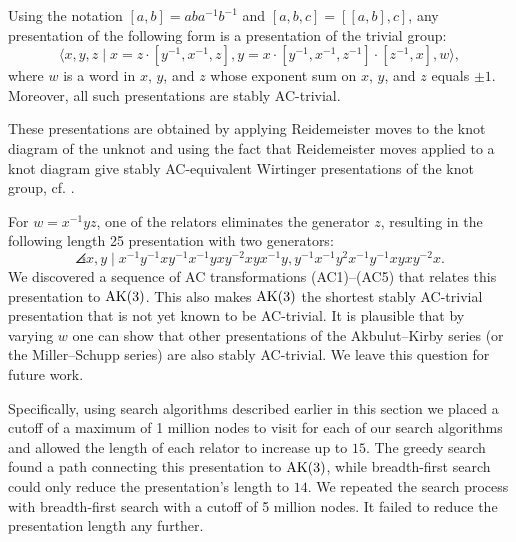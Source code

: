 \begin{theorem*}\label{theorem:MMS}
	Using the notation $[a, b] = a b a^{-1} b^{-1}$ and $[a, b, c] = [[a, b], c]$, any presentation of the following form is a presentation of the trivial group:
	\[
	\langle x, y, z \mid x = z \cdot [y^{-1}, x^{-1}, z], y = x \cdot [y^{-1}, x^{-1}, z^{-1}] \cdot [z^{-1}, x], w \rangle,
	\]
	where $w$ is a word in $x$, $y$, and $z$ whose exponent sum on $x$, $y$, and $z$ equals $\pm 1$. Moreover, all such presentations are stably AC-trivial.
\end{theorem*}

These presentations are obtained by applying Reidemeister moves to the knot diagram of the unknot and using the fact that Reidemeister moves applied to a knot diagram give stably AC-equivalent Wirtinger presentations of the knot group, cf. \cite{WADA1994241}.

For $w = x^{-1}yz$, one of the relators eliminates the generator $z$, resulting in the following length 25 presentation with two generators:
\[
\angles{ x, y \mid
	x^{-1}y^{-1}xy^{-1}x^{-1}yxy^{-2}xyx^{-1}y,
	y^{-1}x^{-1}y^2x^{-1}y^{-1}xyxy^{-2}x }.
\]
We discovered a sequence of AC transformations (AC1)--(AC5) that relates this presentation to $\text{AK}(3)$.
This also makes $\text{AK}(3)$ the shortest stably AC-trivial presentation that is not yet known to be AC-trivial.
It is plausible that by varying $w$ one can show that other presentations of the Akbulut--Kirby series (or the Miller--Schupp series) are also stably AC-trivial.
We leave this question for future work.

Specifically, using search algorithms described earlier in this section we placed a cutoff of a maximum of 1 million nodes to visit for each of our search algorithms and allowed the length of each relator to increase up to $15$.
The greedy search found a path connecting this presentation to $\text{AK}(3)$, while breadth-first search could only reduce the presentation's length to $14$.
We repeated the search process with breadth-first search with a cutoff of 5 million nodes.
It failed to reduce the presentation length any further.


